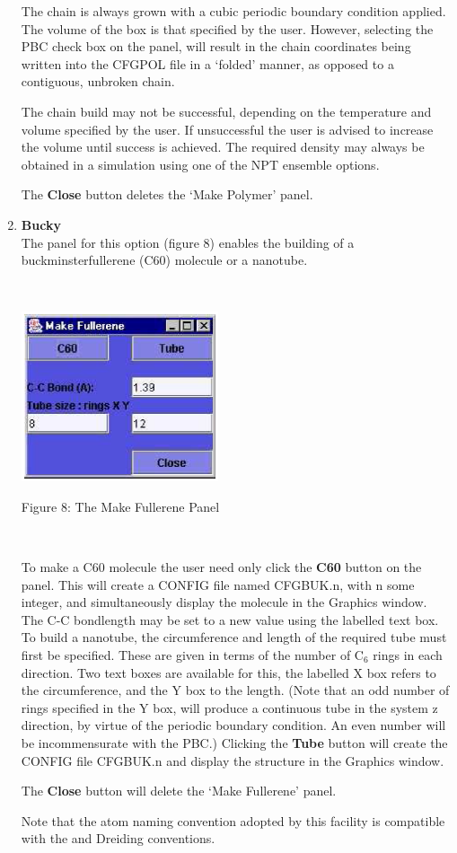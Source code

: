 \begin{enumerate}
The chain is always grown with a cubic periodic boundary condition
applied. The volume of the box is that specified by the user.
However, selecting the PBC check box on the panel, will result in the
chain coordinates being written into the CFGPOL file in a `folded'
manner, as opposed to a contiguous, unbroken chain.

The chain build may not be successful, depending on the temperature
and volume specified by the user. If unsuccessful the user is advised
to increase the volume until success is achieved. The required density
may always be obtained in a \DD{} simulation using one of the NPT
ensemble options.

The {\bf Close} button deletes the `Make Polymer' panel.

\item {\bf Bucky}\\
The panel for this option (figure 8) enables the building of a
buckminsterfullerene (C60) molecule or a nanotube.

~

\vskip 5mm
\centerline{\includegraphics[height=5cm]{bucky.ps}}
\centerline{Figure 8: The Make Fullerene Panel}
\vskip 5mm

~

\noindent
To make a C60 molecule the user need only click the {\bf C60} button
on the panel. This will create a CONFIG file named CFGBUK.n, with n
some integer, and simultaneously display the molecule in the Graphics
window. The C-C bondlength may be set to a new value using the
labelled text box. To build a nanotube, the circumference and
length of the required tube must first be specified. These are
given in terms of the number of C$_6$ rings in each direction. Two
text boxes are available for this, the labelled X box refers to the
circumference, and the Y box to the length. (Note that an odd number
of rings specified in the Y box, will produce a continuous tube in the
system z direction, by virtue of the periodic boundary condition. An
even number will be incommensurate with the PBC.) Clicking the {\bf
Tube} button will create the CONFIG file CFGBUK.n and display the
structure in the Graphics window. 

The {\bf Close} button will delete the `Make Fullerene' panel.

Note that the atom naming convention adopted by this facility is
compatible with the \DD{} and Dreiding conventions.
\end{enumerate}

